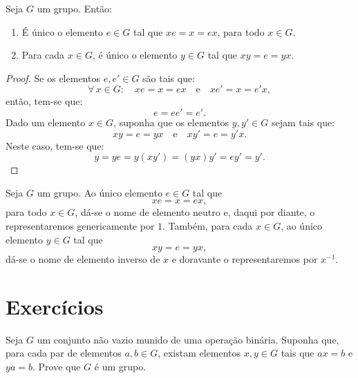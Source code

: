 \begin{proposition}
  Seja $G$ um grupo. Então:
  \begin{enumerate}
    \item É único o elemento $e\in{G}$ tal que $xe=x=ex$, para todo $x\in{G}$.
    \item Para cada $x\in{G}$, é único o elemento $y\in{G}$ tal que $xy=e=yx$.
  \end{enumerate}
\end{proposition}

\begin{proof}
  Se os elementos $e,e'\in{G}$ são tais que:
  \[
    \forall\,x\in{G}:
    \quad
    xe=x=ex
    \quad\text{e}\quad
    xe'=x=e'x,
  \]
  então, tem-se que:
  \[
    e=ee'=e'.
  \]
  Dado um elemento $x\in{G}$, suponha que os elementos $y,y'\in{G}$ sejam tais que:
  \[
    xy=e=yx
    \quad\text{e}\quad
    xy'=e=y'x.
  \]
  Neste caso, tem-se que:
  \[
    y=ye=y(xy')=(yx)y'=ey'=y'.
  \]
\end{proof}

\begin{remark}
  Seja $G$ um grupo. Ao único elemento $e\in{G}$ tal que \[xe=x=ex,\] para todo $x\in{G}$, dá-se o nome de elemento neutro e, daqui por diante, o representaremos genericamente por $1$. Também, para cada $x\in{G}$, ao único elemento $y\in{G}$ tal que \[xy=e=yx,\] dá-se o nome de elemento inverso de $x$ e doravante o representaremos por $x^{-1}$.
\end{remark}

\section*{Exercícios}

\begin{exercise}
  Seja $G$ um conjunto não vazio munido de uma operação binária. Suponha que, para cada par de elementos $a,b\in{G}$, existam elementos $x,y\in{G}$ tais que $ax=b$ e $ya=b$. Prove que $G$ é um grupo.
\end{exercise}
